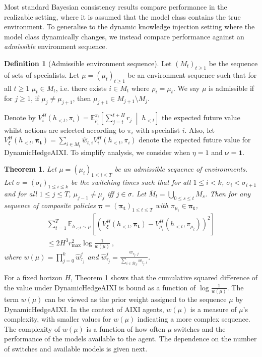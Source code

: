 \documentclass[letterpaper]{article} %
\newcommand {\E}{\mathbb{E}}
\newcommand{\vbar}{\;\middle|\;}
\newtheorem{theorem}{Theorem}
\theoremstyle{definition}
\newtheorem{defn}{Definition}
\begin{document}
Most standard Bayesian consistency results compare performance in the realizable setting, where it is assumed that the model class contains the true environment.
To generalise to the dynamic knowledge injection setting where the model class dynamically changes, we instead compare performance against an \textit{admissible} environment sequence. 
\begin{defn}[Admissible environment sequence]
    Let $(M_t)_{t \geq 1}$ be the sequence of sets of specialists. Let $\mu = (\mu_t)_{t \geq 1}$ be an environment sequence such that for all $t \geq 1$ $\mu_t \in M_t$, i.e. there exists $i \in M_t$ where $\rho_i = \mu_t$. We say $\mu$ is admissible if for $j \geq 1$, if $\mu_j \neq \mu_{j+1}$, then $\mu_{j+1} \in M_{j+1} \setminus M_j$.
\end{defn}
Denote by ${V_{i}^H(h_{<t}, \pi_i) = \E^{\pi_i}_{\rho_i} \left[ \sum_{j=t}^{t+H} r_j \vbar h_{<t} \right]}$ the expected future value whilst actions are selected according to $\pi_i$ with specialist $i$. 
Also, let $V_{\xi}^{H}(h_{<t}, \bm{\pi_t}) = \sum_{i \in M_t} \hat{w}_{t, i} V_i^{H}(h_{<t}, \pi_i)$ denote the expected future value for DynamicHedgeAIXI. 
To simplify analysis, we consider when $\eta = 1$ and $\bm{\nu} = \bm{1}$.

\begin{theorem}
    \label{thm:DHA_value_mu}
    Let $\mu = (\mu_i)_{1 \leq i \leq T}$ be an admissible sequence of environments. 
    Let $\sigma = (\sigma_i)_{1 \leq i \leq k}$ be the switching times such that for all $1 \leq i < k$, $\sigma_i < \sigma_{i+1}$ and for all $1 \leq j \leq T$, $\mu_{j-1} \neq \mu_{j}$ iff $j \in \sigma$. 
    Let $\bar{M}_t = \bigcup_{0 \leq s \leq t} M_s$.
    Then for any sequence of composite policies $\bm{\pi} = (\bm{\pi_t})_{1 \leq t \leq T}$ with $\pi_{\mu_t} \in \bm{\pi_t}$,
    \begin{multline}
        \sum_{t=1}^{T} \E_{h_{<t} \sim \mu} \left[ \left( V_{\xi}^{H}(h_{<t}, \bm{\pi_t}) - V_{\mu_{t}}^{H}(h_{<t}, \pi_{\mu_t}) \right)^2 \right] \\
        \leq 2 H^3 r_{\max}^2 \log \frac{1}{w(\mu)}~,
    \end{multline}
    where $w(\mu) = \prod_{j=0}^{k} \hat{w}^{j}_{\tau_j}$ and $\hat{w}^{j}_{\tau_j} = \frac{w_{\tau_j,j}}{\sum_{i \in \bar{M}_T} w_{\tau_j, i}}$. 
\end{theorem}

For a fixed horizon $H$, Theorem \ref{thm:DHA_value_mu} shows that the cumulative squared difference of the value under DynamicHedgeAIXI is bound as a function of $\log \frac{1}{w(\mu)}$. The term $w(\mu)$ can be viewed as the prior weight assigned to the sequence $\mu$ by DynamicHedgeAIXI. In the context of AIXI agents, $w(\mu)$ is a measure of $\mu$'s complexity, with smaller values for $w(\mu)$ indicating a more complex sequence. The complexity of $w(\mu)$ is a function of how often $\mu$ switches and the performance of the models available to the agent. The dependence on the number of switches and available models is given next.
\end{document}
